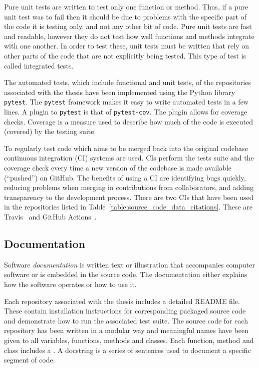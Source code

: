 Pure unit tests are written to test only one function or method. Thus, if a pure
unit test was to fail then it should be due to problems with the specific part
of the code it is testing only, and not any other bit of code. Pure unit tests
are fast and readable, however they do not test how well functions and methods
integrate with one another. In order to test these, unit tests must be written
that rely on other parts of the code that are not explicitly being tested. This
type of test is called integrated tests.

The automated tests, which include functional and unit tests, of the
repositories associated with the thesis have been implemented using the Python
library \texttt{pytest}. The \texttt{pytest} framework
makes it easy to write automated tests in a few lines. A plugin to
\texttt{pytest} is that of \texttt{pytest-cov}. The plugin
allows for coverage checks. Coverage is a measure used to describe how much of
the code is executed (covered) by the testing suite.

To regularly test code which aims to be merged back into the original codebase
continuous integration (CI) systems are used. CIs perform the tests suite and
the coverage check every time a new version of the codebase is made available
(``pushed'') on GitHub. The benefits of using a CI are identifying bugs quickly,
reducing problems when merging in contributions from collaborators, and adding
transparency to the development process. There are two CIs that have been used
in the repositories listed in Table~\ref{table:source_code_data_citations}.
These are Travis~\cite{travis} and GitHub Actions~\cite{github_actions}.

\subsection{Documentation}

Software \textit{documentation} is written text or illustration that accompanies
computer software or is embedded in the source code. The documentation either
explains how the software operates or how to use it.

Each repository associated with the thesis includes a detailed README file.
These contain installation instructions for corresponding packaged source code
and demonstrate how to run the associated test suite. The source code for each
repository has been written in a modular way and meaningful names have been
given to all variables, functions, methods and classes. Each function, method
and class includes a . A docstring is a series of sentences used
to document a specific segment of code.

